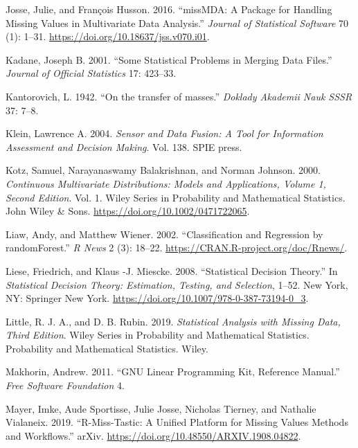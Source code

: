\begin{CSLReferences}{1}{0}
\leavevmode{}%
Josse, Julie, and François Husson. 2016. {``{missMDA}: A Package for Handling Missing Values in Multivariate Data Analysis.''} \emph{Journal of Statistical Software} 70 (1): 1--31. \url{https://doi.org/10.18637/jss.v070.i01}.

\leavevmode{}%
Kadane, Joseph B. 2001. {``Some Statistical Problems in Merging Data Files.''} \emph{Journal of Official Statistics} 17: 423--33.

\leavevmode{}%
Kantorovich, L. 1942. {``{On the transfer of masses}.''} \emph{Doklady Akademii Nauk SSSR} 37: 7--8.

\leavevmode{}%
Klein, Lawrence A. 2004. \emph{Sensor and Data Fusion: A Tool for Information Assessment and Decision Making}. Vol. 138. SPIE press.

\leavevmode{}%
Kotz, Samuel, Narayanaswamy Balakrishnan, and Norman Johnson. 2000. \emph{Continuous Multivariate Distributions: Models and Applications, Volume 1, Second Edition}. Vol. 1. Wiley Series in Probability and Mathematical Statistics. John Wiley \& Sons. \url{https://doi.org/10.1002/0471722065}.

\leavevmode{}%
Liaw, Andy, and Matthew Wiener. 2002. {``Classification and Regression by randomForest.''} \emph{R News} 2 (3): 18--22. \url{https://CRAN.R-project.org/doc/Rnews/}.

\leavevmode{}%
Liese, Friedrich, and Klaus -J. Miescke. 2008. {``Statistical Decision Theory.''} In \emph{Statistical Decision Theory: Estimation, Testing, and Selection}, 1--52. New York, NY: Springer New York. \url{https://doi.org/10.1007/978-0-387-73194-0_3}.

\leavevmode{}%
Little, R. J. A., and D. B. Rubin. 2019. \emph{Statistical Analysis with Missing Data, Third Edition}. Wiley Series in Probability and Mathematical Statistics. Probability and Mathematical Statistics. Wiley.

\leavevmode{}%
Makhorin, Andrew. 2011. {``GNU Linear Programming Kit, Reference Manual.''} \emph{Free Software Foundation} 4.

\leavevmode{}%
Mayer, Imke, Aude Sportisse, Julie Josse, Nicholas Tierney, and Nathalie Vialaneix. 2019. {``R-Miss-Tastic: A Unified Platform for Missing Values Methods and Workflows.''} arXiv. \url{https://doi.org/10.48550/ARXIV.1908.04822}.


\end{CSLReferences}
